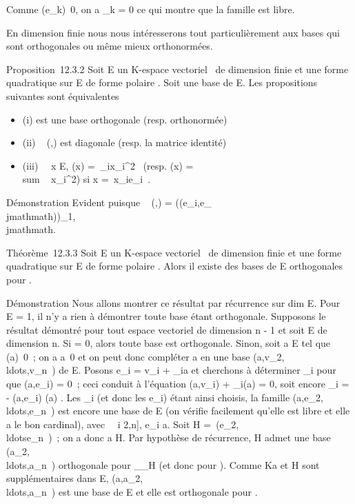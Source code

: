 \documentclass[]{article}
\begin{document}
Comme \Phi(e_k)\neq~0, on a \lambda_k =
0 ce qui montre que la famille est libre.

En dimension finie nous nous intéresserons tout particulièrement aux
bases qui sont orthogonales ou même mieux orthonormées.

Proposition~12.3.2 Soit E un K-espace vectoriel ~de dimension finie et \Phi
une forme quadratique sur E de forme polaire \phi. Soit  une base de E.
Les propositions suivantes sont équivalentes

\begin{itemize}
\itemsep1pt\parskip0pt
\item
  (i)  est une base orthogonale (resp. orthonormée)
\item
  (ii) \mathrmMat~ (\phi,) est
  diagonale (resp. la matrice identité)
\item
  (iii) \forall~~x \in E, \Phi(x) =\
  \sum  \alpha_ix_i^2~
  (resp. \Phi(x) = \\sum ~
  x_i^2) si x =\
  \sum  x_ie_i~.
\end{itemize}

Démonstration Evident puisque
\mathrmMat~ (\phi,) =
(\phi(e_i,e_\\jmathmath))_1\leqi,\\jmathmath\leqn.

Théorème~12.3.3 Soit E un K-espace vectoriel ~de dimension finie et \Phi
une forme quadratique sur E de forme polaire \phi. Alors il existe des
bases de E orthogonales pour \phi.

Démonstration Nous allons montrer ce résultat par récurrence sur
dim E. Pour \dim~ E =
1, il n'y a rien à démontrer toute base étant orthogonale. Supposons le
résultat démontré pour tout espace vectoriel de dimension n - 1 et soit
E de dimension n. Si \Phi = 0, alors toute base est orthogonale. Sinon,
soit a \in E tel que \Phi(a)\neq~0~; on a
a\neq~0 et on peut donc compléter a en une base
(a,v_2,\\ldots,v_n~)
de E. Posons e_i = v_i + \lambda_ia et cherchons à
déterminer \lambda_i pour que \phi(a,e_i) = 0~; ceci conduit à
l'équation \phi(a,v_i) + \lambda_i\Phi(a) = 0, soit encore
\lambda_i = - \phi(a,e_i) \over \Phi(a) . Les
\lambda_i (et donc les e_i) étant ainsi choisis, la famille
(a,e_2,\\ldots,e_n~)
est encore une base de E (on vérifie facilement qu'elle est libre et
elle a le bon cardinal), avec \forall~~i \in {[}2,n{]},
e_i \bot a. Soit H =\
\mathrmVect(e_2,\\ldotse_n~)~;
on a donc a \bot H. Par hypothèse de récurrence, H admet une base
(a_2,\\ldots,a_n~)
orthogonale pour \Phi__H (et donc pour \Phi).
Comme Ka et H sont supplémentaires dans E,
(a,a_2,\\ldots,a_n~)
est une base de E et elle est orthogonale pour \phi.
\end{document}
